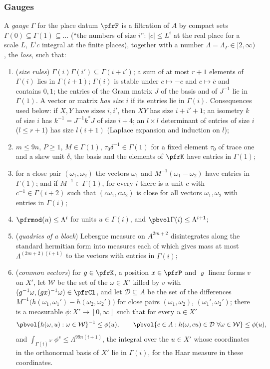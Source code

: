 \documentclass[10pt]{amsart}
\theoremstyle{definition}
\theoremstyle{remark}
\begin{document}
\subsubsection*{Gauges}
A \emph{gauge} $\Gamma$ for the place datum $\pfrF$ is a filtration of $A$ by compact sets
$\Gamma(0)\subseteq\Gamma(1)\subseteq\dots$ (``the numbers of size $i$'': $|c|\le L^i$ at the real place
for a scale $L$, $L^ic$ integral at the finite places), together with a
number $\Lambda=\Lambda_\Gamma\in[2,\infty)$, the \emph{loss}, such that:
\begin{enumerate}
\item[(G0)] (\emph{size rules}) $\Gamma(i)\Gamma(i')\subseteq\Gamma(i+i')$; a sum of at most $r+1$ elements of
$\Gamma(i)$ lies in $\Gamma(i+1)$; $\Gamma(i)$ is stable under $c\mapsto-c$ and $c\mapsto\bar c$ and contains $0,1$;
the entries of the Gram matrix $J$ of the basis and of $J^{-1}$ lie in $\Gamma(1)$. A vector or matrix
\emph{has size $i$} if its entries lie in $\Gamma(i)$. Consequences used below: if $X,Y$ have sizes $i,i'$,
then $XY$ has size $i+i'+1$; an isometry $k$ of size $i$ has $k^{-1}=J^{-1}k^*J$ of size $i+4$; an
$l\times l$ determinant of entries of size $i$ ($l\le r+1$) has size $l(i+1)$ (Laplace expansion and
induction on $l$);
\item[(G1)] $m\le9n$, $P\ge1$, $M\in\Gamma(1)$, $\tau_0\delta^{-1}\in\Gamma(1)$ for a fixed element $\tau_0$ of trace one and a skew unit $\delta$, the basis and the elements of $\pfrK$ have entries in
$\Gamma(1)$;
\item[(G2)] for a close pair $(\omega_1,\omega_2)$ the vectors $\omega_1$ and $M^{-1}(\omega_1-\omega_2)$
have entries in $\Gamma(1)$; and if $M^{-1}\in\Gamma(1)$, for every $i$ there is a unit $c$ with
$c^{-1}\in\Gamma(i+2)$ such that $(c\omega_1,c\omega_2)$ is close for all vectors $\omega_1,\omega_2$ with
entries in $\Gamma(i)$;
\item[(G3)] $\pfrmod(u)\le\Lambda^i$ for units $u\in\Gamma(i)$, and $\pbvol\Gamma(i)\le\Lambda^{i+1}$;
\item[(G4)] (\emph{quadrics of a block}) Lebesgue measure on $A^{2m+2}$ disintegrates along the
standard hermitian form into measures each of which gives mass at most $\Lambda^{(2m+2)(i+1)}$ to the
vectors with entries in $\Gamma(i)$;
\item[(G5)] (\emph{common vectors}) for $g\in\pfrK$, a position $x\in\pfrP$ and $\varrho$ linear forms
$v$ on $X'$, let $\mathcal W$ be the set of the $\omega\in X'$ killed by $v$ with $(g^{-1}\omega,
(gx)^{-1}\omega)\in\pfrCl$, and let $\mathcal D\subseteq A$ be the set of the differences
$M^{-1}\bigl(h(\omega_1,\omega_1')-h(\omega_2,\omega_2')\bigr)$ for close pairs $(\omega_1,\omega_2)$,
$(\omega_1',\omega_2')$; there is a measurable $\phi\colon X'\to[0,\infty]$ such that for every $u\in X'$
\[
\pbvol\{h(\omega,u):\omega\in\mathcal W\}^{-1}\le\phi(u),\qquad
\pbvol\{c\in A:h(\omega,cu)\in\mathcal D\ \forall\omega\in\mathcal W\}\le\phi(u),
\]
and $\int_{\Gamma(i)^{X'}}\phi^s\le\Lambda^{99n(i+1)}$, the integral over the $u\in X'$ whose coordinates in the
orthonormal basis of $X'$ lie in $\Gamma(i)$, for the Haar measure in these coordinates.
\end{enumerate}
\end{document}
